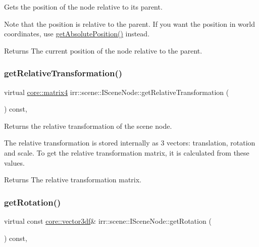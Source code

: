 Gets the position of the node relative to its parent. 

Note that the position is relative to the parent. If you want the position in world coordinates, use \hyperlink{classirr_1_1scene_1_1ISceneNode_a09a1c2ce3cf5448197a0c7b0bb16a516}{get\+Absolute\+Position()} instead. \begin{DoxyReturn}{Returns}
The current position of the node relative to the parent. 
\end{DoxyReturn}
\mbox{\label{classirr_1_1scene_1_1ISceneNode_ac7c47ec49174315af83cf5f5d24edb24}} 
\subsubsection{\texorpdfstring{get\+Relative\+Transformation()}{getRelativeTransformation()}}
{\footnotesize\ttfamily virtual \hyperlink{namespaceirr_1_1core_a73fa92e638c5ca97efd72da307cc9b65}{core\+::matrix4} irr\+::scene\+::\+I\+Scene\+Node\+::get\+Relative\+Transformation (\begin{DoxyParamCaption}{ }\end{DoxyParamCaption}) const\hspace{0.3cm}{\ttfamily [inline]}, {\ttfamily [virtual]}}



Returns the relative transformation of the scene node. 

The relative transformation is stored internally as 3 vectors\+: translation, rotation and scale. To get the relative transformation matrix, it is calculated from these values. \begin{DoxyReturn}{Returns}
The relative transformation matrix. 
\end{DoxyReturn}
\mbox{\label{classirr_1_1scene_1_1ISceneNode_acfef9f174e2398b479915791e4084061}} 
\subsubsection{\texorpdfstring{get\+Rotation()}{getRotation()}}
{\footnotesize\ttfamily virtual const \hyperlink{namespaceirr_1_1core_a06f169d08b5c429f5575acb7edbad811}{core\+::vector3df}\& irr\+::scene\+::\+I\+Scene\+Node\+::get\+Rotation (\begin{DoxyParamCaption}{ }\end{DoxyParamCaption}) const\hspace{0.3cm}{\ttfamily [inline]}, {\ttfamily [virtual]}}



